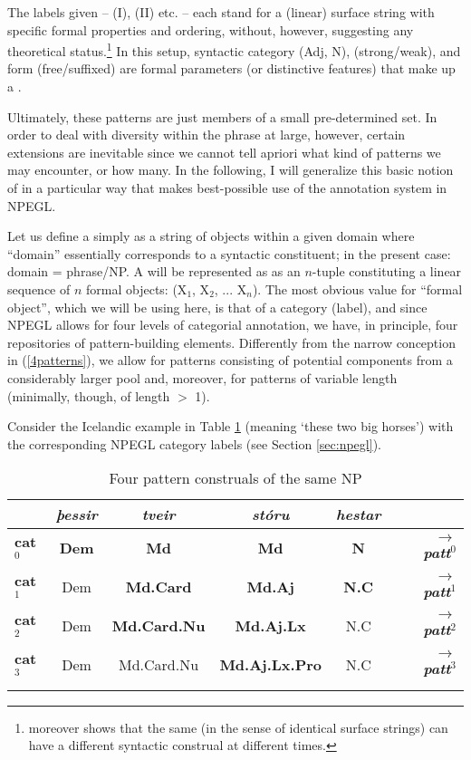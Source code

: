\documentclass[output=paper,colorlinks,citecolor=brown,draft]{langscibook}
\begin{document}
The labels given –  (I),  (II) etc. – each stand for a (linear) surface string with specific formal properties and ordering, without, however, suggesting any theoretical status.\footnote{\citet{Pfaff2019} moreover shows that the same  (in the sense of identical surface strings) can have a different syntactic construal at different times.  }   In this setup,  syntactic category (Adj, N),   (strong/weak), and  form (free/suffixed) are formal parameters (or distinctive features) that make up a . 

Ultimately,  these patterns are  just members of a small pre-determined set. In order to deal with diversity within the  phrase at large, however, certain extensions are inevitable  since we cannot tell apriori what  kind of patterns we may encounter, or how many.  In the following, I will generalize this basic notion of  in a particular way that makes best-possible use of the annotation system in NPEGL. 


Let us define a  simply as a string of objects within a given domain where  ``domain'' essentially corresponds to a syntactic constituent; in the present case: domain =  phrase/NP.  A  will be represented as  as an $n$-tuple constituting a linear sequence of $n$ formal objects: (X$_1$, X$_2$,  ... X$_n$). The most obvious value for ``formal object'', which we will be using here, is that of a category (label), and since NPEGL allows for four levels of categorial annotation, we have, in principle, four repositories of pattern-building elements. Differently from the narrow conception in (\ref{4patterns}), we allow for patterns consisting of potential components from a considerably larger pool  and, moreover, for patterns  of variable length (minimally, though, of length $>$ 1). 

Consider the Icelandic example in Table \ref{tab:tp} (meaning `these two big horses') with the corresponding NPEGL category labels (see Section \ref{sec:npegl}). 

\begin{table}
\caption{Four pattern construals of the same NP  }
\label{tab:tp}
\begin{tabular}{l  c  c  c  c  r}
\lsptoprule
   & \textit{þessir}  & \textit{tveir} & \textit{stóru} & \textit{hestar} &  \\
   \midrule
  \textbf{cat$^0$} & \phantom{X}\textbf{Dem}\phantom{X} & \textbf{Md} & \textbf{Md} & \textbf{N} & $\rightarrow$ \ \textit{\textbf{patt$^0$}} \\  
  \textbf{cat$^1$} & Dem & \textbf{Md.Card} & \textbf{Md.Aj} & \textbf{ N.C} & $\rightarrow$ \ \textit{\textbf{patt$^1$}}  \\  
  \textbf{cat$^2$} & Dem & \textbf{Md.Card.Nu} & \textbf{Md.Aj.Lx} & N.C & $\rightarrow$  \ \textit{\textbf{patt$^2$}}	  \\  
  \textbf{cat$^3$} & Dem & Md.Card.Nu & \textbf{Md.Aj.Lx.Pro} & N.C & $\rightarrow$  \ \textit{\textbf{patt$^3$}}  \\  
\lspbottomrule
\end{tabular}
\end{table}
\end{document}
